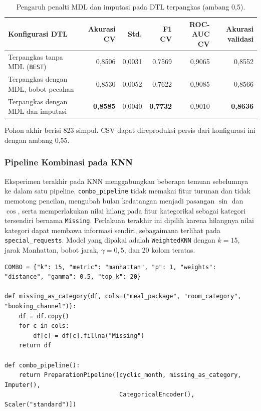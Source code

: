 \begin{table}[htbp]
    \centering
    \small
    \setlength{\tabcolsep}{4pt}
    \begin{tabularx}{\textwidth}{@{}X r r r r r@{}}
        \toprule
        Konfigurasi DTL & Akurasi CV & Std. & F1 CV & ROC-AUC CV & Akurasi validasi \\
        \midrule
        Terpangkas tanpa MDL (\texttt{BEST}) & 0,8506 & 0,0031 & 0,7569 & 0,9065 & 0,8552 \\
        Terpangkas dengan MDL, bobot pecahan & 0,8530 & 0,0052 & 0,7622 & 0,9085 & 0,8566 \\
        Terpangkas dengan MDL dan imputasi & \textbf{0,8585} & 0,0040 & \textbf{0,7732} & 0,9010 & \textbf{0,8636} \\
        \bottomrule
    \end{tabularx}
    \caption{Pengaruh penalti MDL dan imputasi pada DTL terpangkas (ambang 0,5).}
    \label{tab:mdl}
\end{table}

Pohon akhir berisi 823 simpul. CSV  dapat direproduksi persis dari konfigurasi ini dengan ambang 0,55.

\subsubsection{Pipeline Kombinasi pada KNN}
Eksperimen terakhir pada KNN menggabungkan beberapa temuan sebelumnya ke dalam satu pipeline. \texttt{combo\_pipeline} tidak memakai fitur turunan dan tidak memotong pencilan, mengubah bulan kedatangan menjadi pasangan $\sin$ dan $\cos$, serta memperlakukan nilai hilang pada fitur kategorikal sebagai kategori tersendiri bernama \texttt{Missing}. Perlakuan terakhir ini dipilih karena hilangnya nilai kategori dapat membawa informasi sendiri, sebagaimana terlihat pada \texttt{special\_requests}. Model yang dipakai adalah \texttt{WeightedKNN} dengan $k=15$, jarak Manhattan, bobot jarak, $\gamma=0{,}5$, dan 20 kolom teratas.

\begin{lstlisting}[caption={Pipeline kombinasi KNN (\texttt{src/knn\_tuning.py})},label={lst:knn-combo}]
COMBO = {"k": 15, "metric": "manhattan", "p": 1, "weights": "distance", "gamma": 0.5, "top_k": 20}

def missing_as_category(df, cols=("meal_package", "room_category", "booking_channel")):
    df = df.copy()
    for c in cols:
        df[c] = df[c].fillna("Missing")
    return df

def combo_pipeline():
    return PreparationPipeline([cyclic_month, missing_as_category, Imputer(),
                                CategoricalEncoder(), Scaler("standard")])
\end{lstlisting}

